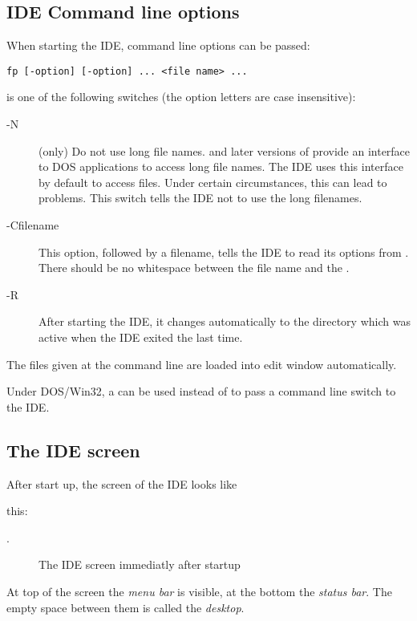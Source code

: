 \subsection{IDE Command line options}
When starting the IDE, command line options can be passed:
\begin{verbatim}
fp [-option] [-option] ... <file name> ...
\end{verbatim}
 is one of the following switches (the option letters
are case insensitive):
\begin{description}
\item [-N] (\dos only) Do not use long file names.  and later
versions of \windows provide an interface to DOS applications to access 
long file names. 
The IDE uses this interface by default to access files. Under certain 
circumstances, this can lead to problems. This switch tells the IDE not to
use the long filenames.
\item [-Cfilename] This option, followed by a filename, tells the IDE to
read its options from . There should be no whitespace between
the file name and the .
\item [-R] After starting the IDE, it changes automatically to the directory
which was active when the IDE exited the last time.
\end{description}
The files given at the command line are loaded into edit
window automatically.

\begin{remark}
Under DOS/Win32, a \var{/} can be used instead of \var{-} to pass a
command line switch to the IDE.
\end{remark}

\subsection{The IDE screen}

After start up, the screen of the IDE looks like 
\begin{htmlonly}
this:
\end{htmlonly}
\begin{latexonly}
.
\begin{figure}
\caption{The IDE screen immediatly after startup}
\label{fig:idestart}
\ifpdf
{}
\else
{}
\fi
\end{figure}
\end{latexonly}
At top of the screen the \emph{menu bar} is visible, at the bottom
the \emph{status bar}. The empty space between them is called the
\emph{desktop}.

